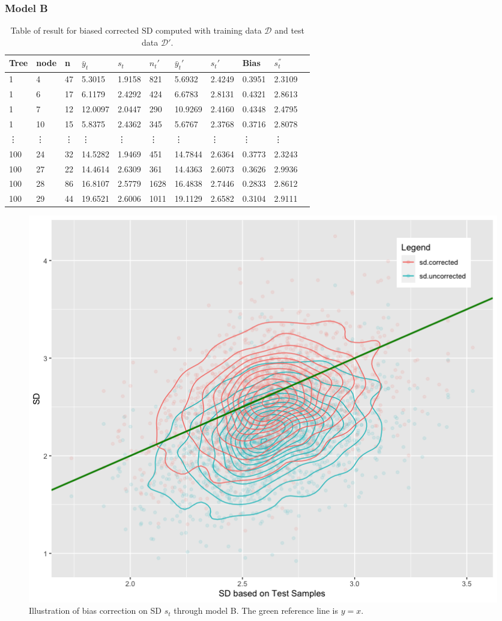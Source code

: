 \subsubsection{Model B}
\vspace{0.1in}
\begin{table}[H]
	\caption{Table of result for biased corrected SD computed with training data $\mathcal{D}$ and test data $\mathcal{D}'$. }
	\begin{tabular}{ |p{0.7cm}|p{0.8cm}|p{0.5cm}|p{1.4cm}|p{1.4cm}|p{1cm}|p{1.4cm}|p{1.5cm}|p{1.5cm}|p{1.5cm}|p{1.4cm}|}
		\hline
		Tree    &node  &n   &$\bar{y}_{t}$ &$s_t$ &$n_t'$ &$\bar{y}_{t}'$ & $s_t'$ &Bias &$s^{''}_t$\\
		\hline
		1&	4&	47&	5.3015&	1.9158&	821&	5.6932&	2.4249&	0.3951&	2.3109\\

		1&	6&	17&	6.1179	& 2.4292&	424	&6.6783&	2.8131&	0.4321&	2.8613\\
		1&	7&	12&	12.0097&	2.0447&	290	&10.9269&	2.4160&	0.4348&	2.4795\\
		1&	10&	15&	5.8375&	2.4362&	345&	5.6767&	2.3768&	0.3716&	2.8078\\
   		\vdots & \vdots & \vdots & \vdots & \vdots & \vdots  & \vdots & \vdots&\vdots&\vdots\\  
   		100&24&	32&	14.5282&	1.9469&	451&	14.7844&	2.6364&	0.3773&	2.3243\\
   		100&27&	22&	14.4614&	2.6309&	361&	14.4363&	2.6073&	0.3626&	2.9936\\

   		100&28&	86&	16.8107&	2.5779&	1628&	16.4838&	2.7446&	0.2833&	2.8612\\
   		100&29&	44&	19.6521&	2.6006&	1011&	19.1129&	2.6582&	0.3104&	2.9111\\
		\hline
	\end{tabular}
	\label{table:3}
\end{table}

\begin{figure}[H]
	\centering
	\includegraphics[scale=0.40, angle=0]{modB.png}
	\caption{Illustration of bias correction on SD $s_t$ through model B. The green reference line is $y=x$. 
		\label{fig02-bias-sdB}}
\end{figure}


